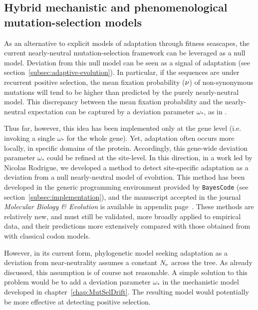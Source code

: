 \subsection{Hybrid mechanistic and phenomenological mutation-selection models}
\label{subsec:hybrid-mechanistic-and-phenomenological-mutation-selection-models}

As an alternative to explicit models of adaptation through fitness seascapes, the current nearly-neutral mutation-selection framework can be leveraged as a null model.
Deviation from this null model can be seen as a signal of adaptation (see section~\ref{subsec:adaptive-evolution}).
In particular, if the sequences are under recurrent positive selection, the mean fixation probability ($\nu$) of non-synonymous mutations will tend to be higher than predicted by the purely nearly-neutral model.
This discrepancy between the mean fixation probability and the nearly-neutral expectation can be captured by a deviation parameter $\omega_*$, as in \citet{Rodrigue2016}.

Thus far, however, this idea has been implemented only at the gene level (i.e. invoking a single $\omega_*$ for the whole gene).
Yet, adaptation often occurs more locally, in specific domains of the protein.
Accordingly, this gene-wide deviation parameter $\omega_*$ could be refined at the site-level.
In this direction, in a work led by Nicolas Rodrigue, we developed a method to detect site-specific adaptation as a deviation from a null nearly-neutral model of evolution.
This method has been developed in the generic programming environment provided by \texttt{BayesCode} (see section~\ref{subsec:implementation}), and the manuscript accepted in the journal \textit{Molecular Biology \& Evolution} is available in appendix page~\pageref{sec-appendix:MutSelM3starMBE}.
These methods are relatively new, and must still be validated, more broadly applied to empirical data, and their predictions more extensively compared with those obtained from with classical codon models.

However, in its current form, phylogenetic model seeking adaptation as a deviation from near-neutrality assumes a constant $N_{\text{e}}$ across the tree.
As already discussed, this assumption is of course not reasonable.
A simple solution to this problem would be to add a deviation parameter $\omega_*$ in the mechanistic model developed in chapter~\ref{chap:MutSelDrift}.
The resulting model would potentially be more effective at detecting positive selection.

